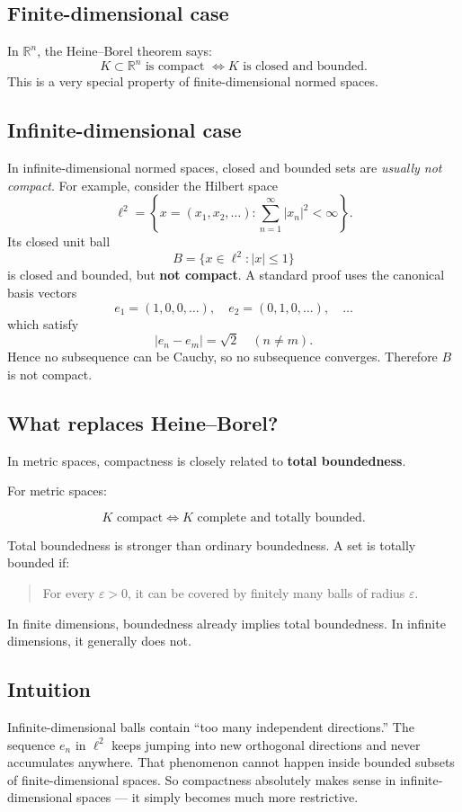 \documentclass[aps,prl,twocolumn,groupedaddress]{revtex4-2}
\begin{document}
\subsection{Finite-dimensional case}

In $\mathbb{R}^n$, the Heine–Borel theorem says:
$$
K \subset \mathbb{R}^n
\text{ is compact }
\iff
K \text{ is closed and bounded.}
$$
This is a very special property of finite-dimensional normed spaces.

\subsection{Infinite-dimensional case}

In infinite-dimensional normed spaces, closed and bounded sets are {\em usually not compact}.
For example, consider the Hilbert space
$$
\ell^2
=
\left\{
x=(x_1,x_2,\dots):
\sum_{n=1}^\infty |x_n|^2 < \infty
\right\}
.
$$
Its closed unit ball
$$
B=\{x\in \ell^2:|x|\le 1\}
$$
is closed and bounded, but {\bf not compact}.
A standard proof uses the canonical basis vectors
$$
e_1=(1,0,0,\dots),\quad
e_2=(0,1,0,\dots),\quad \dots
$$
which satisfy
$$
|e_n-e_m|=\sqrt{2}
\quad (n\neq m).
$$
Hence no subsequence can be Cauchy, so no subsequence converges. Therefore $B$ is not compact.

\subsection{What replaces Heine–Borel?}

In metric spaces, compactness is closely related to {\bf total boundedness}.

For metric spaces:

$$
K \text{ compact}
\iff
K \text{ complete and totally bounded}.
$$

Total boundedness is stronger than ordinary boundedness.
A set is totally bounded if:
\begin{quote}
For every $\varepsilon>0$, it can be covered by finitely many balls of radius $\varepsilon$.
\end{quote}
In finite dimensions, boundedness already implies total boundedness. In infinite dimensions, it generally does not.

\subsection{Intuition}

Infinite-dimensional balls contain ``too many independent directions.''
The sequence $e_n$ in $\ell^2$ keeps jumping into new orthogonal directions and never accumulates anywhere.
That phenomenon cannot happen inside bounded subsets of finite-dimensional spaces.
So compactness absolutely makes sense in infinite-dimensional spaces — it simply becomes much more restrictive.
\end{document}
